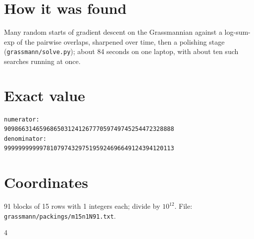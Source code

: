 \documentclass[11pt,a4paper]{article}
\begin{document}
\section{How it was found}
Many random starts of gradient descent on the Grassmannian against a log-sum-exp of the pairwise overlaps, sharpened over time, then a polishing stage (\texttt{grassmann/solve.py}); about 84 seconds on one laptop, with about ten such searches running at once.


\appendix
\section{Exact value}
{\small
\begin{verbatim}
numerator:
909866314659686503124126777059749745254472328888
denominator:
999999999997810797432975195924696649124394120113
\end{verbatim}}

\section{Coordinates}
91 blocks of 15 rows with 1 integers each; divide by $10^{12}$. File: \texttt{grassmann/packings/m15n1N91.txt}.
{\tiny
\begin{multicols}{4}
\end{multicols}}
\end{document}
